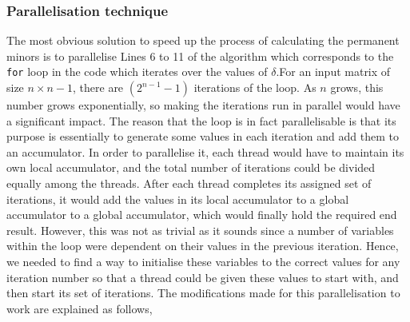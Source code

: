 \documentclass[11pt]{article}
\theoremstyle{theorem}
\theoremstyle{remark}
\theoremstyle{plain}
\theoremstyle{definition}
\begin{document}
\subsubsection{Parallelisation technique}
The most obvious solution to speed up the process of calculating the permanent minors is to parallelise Lines 6 to 11 of the algorithm which corresponds to the \texttt{for} loop in the code which iterates over the values of $\delta$.For an input matrix of size $n \times n-1$, there are $(2^{n-1} -1)$ iterations of the loop. As $n$ grows, this number grows exponentially, so making the iterations run in parallel would have a significant impact. The reason that the loop is in fact parallelisable is that its purpose is essentially to generate some values in each iteration and add them to an accumulator. In order to parallelise it, each thread would have to maintain its own local accumulator, and the total number of iterations could be divided equally among the threads. After each thread completes its assigned set of iterations, it would add the values in its local accumulator to a global accumulator to a global accumulator, which would finally hold the required end result. However, this was not as trivial as it sounds since a number of variables within the loop were dependent on their values in the previous iteration. Hence, we needed to find a way to initialise these variables to the correct values for any iteration number so that a thread could be given these values to start with, and then start its set of iterations. The modifications made for this parallelisation to work are explained as follows,
\end{document}
